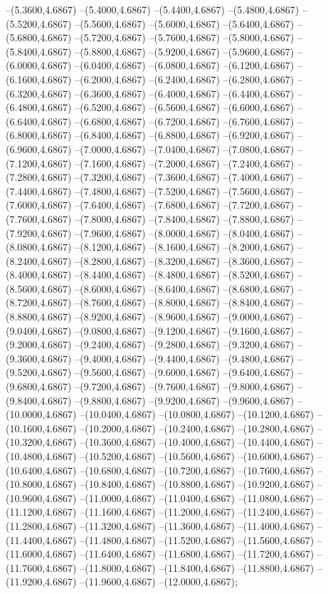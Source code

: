 {	--(5.3600,4.6867)
	--(5.4000,4.6867)
	--(5.4400,4.6867)
	--(5.4800,4.6867)
	--(5.5200,4.6867)
	--(5.5600,4.6867)
	--(5.6000,4.6867)
	--(5.6400,4.6867)
	--(5.6800,4.6867)
	--(5.7200,4.6867)
	--(5.7600,4.6867)
	--(5.8000,4.6867)
	--(5.8400,4.6867)
	--(5.8800,4.6867)
	--(5.9200,4.6867)
	--(5.9600,4.6867)
	--(6.0000,4.6867)
	--(6.0400,4.6867)
	--(6.0800,4.6867)
	--(6.1200,4.6867)
	--(6.1600,4.6867)
	--(6.2000,4.6867)
	--(6.2400,4.6867)
	--(6.2800,4.6867)
	--(6.3200,4.6867)
	--(6.3600,4.6867)
	--(6.4000,4.6867)
	--(6.4400,4.6867)
	--(6.4800,4.6867)
	--(6.5200,4.6867)
	--(6.5600,4.6867)
	--(6.6000,4.6867)
	--(6.6400,4.6867)
	--(6.6800,4.6867)
	--(6.7200,4.6867)
	--(6.7600,4.6867)
	--(6.8000,4.6867)
	--(6.8400,4.6867)
	--(6.8800,4.6867)
	--(6.9200,4.6867)
	--(6.9600,4.6867)
	--(7.0000,4.6867)
	--(7.0400,4.6867)
	--(7.0800,4.6867)
	--(7.1200,4.6867)
	--(7.1600,4.6867)
	--(7.2000,4.6867)
	--(7.2400,4.6867)
	--(7.2800,4.6867)
	--(7.3200,4.6867)
	--(7.3600,4.6867)
	--(7.4000,4.6867)
	--(7.4400,4.6867)
	--(7.4800,4.6867)
	--(7.5200,4.6867)
	--(7.5600,4.6867)
	--(7.6000,4.6867)
	--(7.6400,4.6867)
	--(7.6800,4.6867)
	--(7.7200,4.6867)
	--(7.7600,4.6867)
	--(7.8000,4.6867)
	--(7.8400,4.6867)
	--(7.8800,4.6867)
	--(7.9200,4.6867)
	--(7.9600,4.6867)
	--(8.0000,4.6867)
	--(8.0400,4.6867)
	--(8.0800,4.6867)
	--(8.1200,4.6867)
	--(8.1600,4.6867)
	--(8.2000,4.6867)
	--(8.2400,4.6867)
	--(8.2800,4.6867)
	--(8.3200,4.6867)
	--(8.3600,4.6867)
	--(8.4000,4.6867)
	--(8.4400,4.6867)
	--(8.4800,4.6867)
	--(8.5200,4.6867)
	--(8.5600,4.6867)
	--(8.6000,4.6867)
	--(8.6400,4.6867)
	--(8.6800,4.6867)
	--(8.7200,4.6867)
	--(8.7600,4.6867)
	--(8.8000,4.6867)
	--(8.8400,4.6867)
	--(8.8800,4.6867)
	--(8.9200,4.6867)
	--(8.9600,4.6867)
	--(9.0000,4.6867)
	--(9.0400,4.6867)
	--(9.0800,4.6867)
	--(9.1200,4.6867)
	--(9.1600,4.6867)
	--(9.2000,4.6867)
	--(9.2400,4.6867)
	--(9.2800,4.6867)
	--(9.3200,4.6867)
	--(9.3600,4.6867)
	--(9.4000,4.6867)
	--(9.4400,4.6867)
	--(9.4800,4.6867)
	--(9.5200,4.6867)
	--(9.5600,4.6867)
	--(9.6000,4.6867)
	--(9.6400,4.6867)
	--(9.6800,4.6867)
	--(9.7200,4.6867)
	--(9.7600,4.6867)
	--(9.8000,4.6867)
	--(9.8400,4.6867)
	--(9.8800,4.6867)
	--(9.9200,4.6867)
	--(9.9600,4.6867)
	--(10.0000,4.6867)
	--(10.0400,4.6867)
	--(10.0800,4.6867)
	--(10.1200,4.6867)
	--(10.1600,4.6867)
	--(10.2000,4.6867)
	--(10.2400,4.6867)
	--(10.2800,4.6867)
	--(10.3200,4.6867)
	--(10.3600,4.6867)
	--(10.4000,4.6867)
	--(10.4400,4.6867)
	--(10.4800,4.6867)
	--(10.5200,4.6867)
	--(10.5600,4.6867)
	--(10.6000,4.6867)
	--(10.6400,4.6867)
	--(10.6800,4.6867)
	--(10.7200,4.6867)
	--(10.7600,4.6867)
	--(10.8000,4.6867)
	--(10.8400,4.6867)
	--(10.8800,4.6867)
	--(10.9200,4.6867)
	--(10.9600,4.6867)
	--(11.0000,4.6867)
	--(11.0400,4.6867)
	--(11.0800,4.6867)
	--(11.1200,4.6867)
	--(11.1600,4.6867)
	--(11.2000,4.6867)
	--(11.2400,4.6867)
	--(11.2800,4.6867)
	--(11.3200,4.6867)
	--(11.3600,4.6867)
	--(11.4000,4.6867)
	--(11.4400,4.6867)
	--(11.4800,4.6867)
	--(11.5200,4.6867)
	--(11.5600,4.6867)
	--(11.6000,4.6867)
	--(11.6400,4.6867)
	--(11.6800,4.6867)
	--(11.7200,4.6867)
	--(11.7600,4.6867)
	--(11.8000,4.6867)
	--(11.8400,4.6867)
	--(11.8800,4.6867)
	--(11.9200,4.6867)
	--(11.9600,4.6867)
	--(12.0000,4.6867);
}
